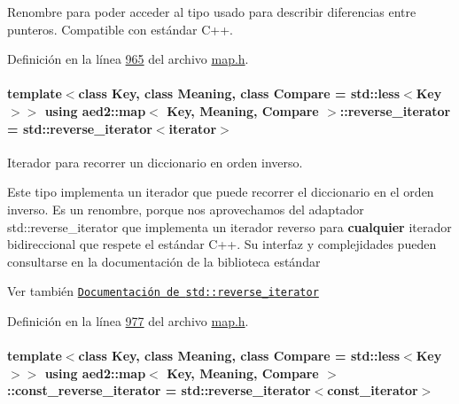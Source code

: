 Renombre para poder acceder al tipo usado para describir diferencias entre punteros. Compatible con estándar C++. 



Definición en la línea \hyperlink{map_8h_source_l00965}{965} del archivo \hyperlink{map_8h_source}{map.\+h}.

\paragraph[{\texorpdfstring{reverse\+\_\+iterator}{reverse_iterator}}]{\setlength{\rightskip}{0pt plus 5cm}template$<$class Key, class Meaning, class Compare = std\+::less$<$\+Key$>$$>$ using {\bf aed2\+::map}$<$ Key, Meaning, Compare $>$\+::{\bf reverse\+\_\+iterator} =  std\+::reverse\+\_\+iterator$<${\bf iterator}$>$}\hypertarget{classaed2_1_1map_a8e6a592062260177fd73b2f9897b1dd5_a8e6a592062260177fd73b2f9897b1dd5}{}\label{classaed2_1_1map_a8e6a592062260177fd73b2f9897b1dd5_a8e6a592062260177fd73b2f9897b1dd5}


Iterador para recorrer un diccionario en orden inverso. 

Este tipo implementa un iterador que puede recorrer el diccionario en el orden inverso. Es un renombre, porque nos aprovechamos del adaptador {\ttfamily std\+::reverse\+\_\+iterator} que implementa un iterador reverso para {\bfseries cualquier} iterador bidireccional que respete el estándar C++. Su interfaz y complejidades pueden consultarse en la documentación de la biblioteca estándar

\begin{DoxySeeAlso}{Ver también}
\href{http://en.cppreference.com/w/cpp/iterator/reverse_iterator}{\tt Documentación de {\ttfamily std\+::reverse\+\_\+iterator}} 
\end{DoxySeeAlso}


Definición en la línea \hyperlink{map_8h_source_l00977}{977} del archivo \hyperlink{map_8h_source}{map.\+h}.

\paragraph[{\texorpdfstring{const\+\_\+reverse\+\_\+iterator}{const_reverse_iterator}}]{\setlength{\rightskip}{0pt plus 5cm}template$<$class Key, class Meaning, class Compare = std\+::less$<$\+Key$>$$>$ using {\bf aed2\+::map}$<$ Key, Meaning, Compare $>$\+::{\bf const\+\_\+reverse\+\_\+iterator} =  std\+::reverse\+\_\+iterator$<${\bf const\+\_\+iterator}$>$}\hypertarget{classaed2_1_1map_aed66a216549d13078a3ea6978ea0b768_aed66a216549d13078a3ea6978ea0b768}{}\label{classaed2_1_1map_aed66a216549d13078a3ea6978ea0b768_aed66a216549d13078a3ea6978ea0b768}


